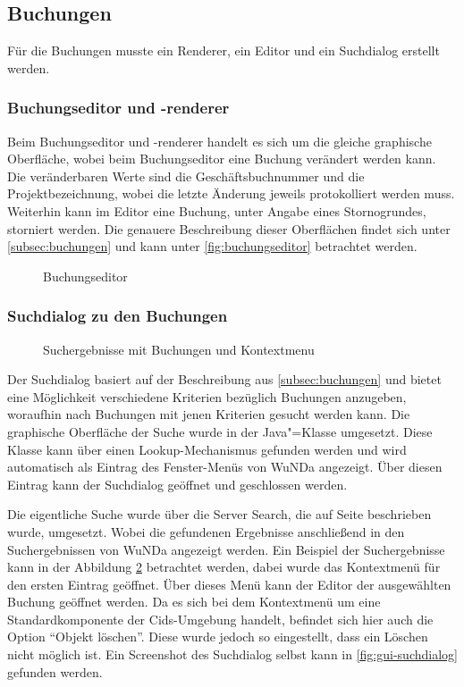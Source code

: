 \subsection{Buchungen}
Für die Buchungen musste ein Renderer, ein Editor und ein Suchdialog erstellt werden.

\subsubsection{Buchungseditor und -renderer}
Beim Buchungseditor und -renderer handelt es sich um die gleiche graphische Oberfläche, wobei beim Buchungseditor eine Buchung verändert werden kann.
Die veränderbaren Werte sind die Geschäftsbuchnummer und die Projektbezeichnung, wobei die letzte Änderung jeweils protokolliert werden muss.
Weiterhin kann im Editor eine Buchung, unter Angabe eines Stornogrundes, storniert werden.
Die genauere Beschreibung dieser Oberflächen findet sich unter \autoref{subsec:buchungen} und kann unter \autoref{fig:buchungseditor} betrachtet werden.

\begin{figure}[htbp]
	\centering
	\caption{Buchungseditor}
	\label{fig:buchungseditor}
\end{figure}

\subsubsection{Suchdialog zu den Buchungen}
\begin{figure}[htbp]
	\centering
	\caption{Suchergebnisse mit Buchungen und Kontextmenu}
	\label{fig:suchergebnisse}
\end{figure}

Der Suchdialog basiert auf der Beschreibung aus \autoref{subsec:buchungen} und bietet eine Möglichkeit verschiedene Kriterien bezüglich Buchungen anzugeben, woraufhin nach Buchungen mit jenen Kriterien gesucht werden kann.
Die graphische Oberfläche der Suche wurde in der Java"=Klasse  umgesetzt.
Diese Klasse kann über einen Lookup-Mechanismus gefunden werden und wird automatisch als Eintrag des Fenster-Menüs von \ac{WuNDa} angezeigt.
Über diesen Eintrag kann der Suchdialog geöffnet und geschlossen werden.

Die eigentliche Suche wurde über die Server Search, die auf Seite \pageref{subsec:serversearch} beschrieben wurde, umgesetzt.
Wobei die gefundenen Ergebnisse  anschließend in den Suchergebnissen von \ac{WuNDa} angezeigt werden.
Ein Beispiel der Suchergebnisse kann in der Abbildung \ref{fig:suchergebnisse} betrachtet werden, dabei wurde das Kontextmenü für den ersten Eintrag geöffnet.
Über dieses Menü kann der Editor der ausgewählten Buchung geöffnet werden.
Da es sich bei dem Kontextmenü um eine Standardkomponente der Cids-Umgebung handelt, befindet sich hier auch die Option "`Objekt löschen"'.
Diese wurde jedoch so eingestellt, dass ein Löschen nicht möglich ist.
Ein Screenshot des Suchdialog selbst kann in \autoref{fig:gui-suchdialog} gefunden werden.

